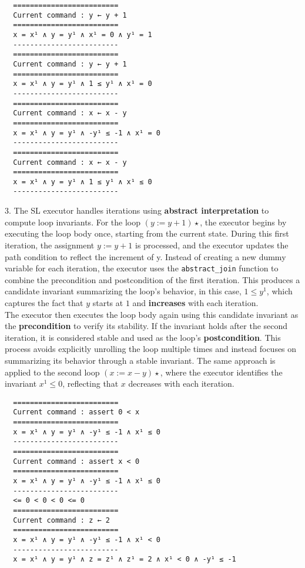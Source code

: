 \documentclass[parskip=half]{scrartcl}
\begin{document}
\begin{verbatim}
  =========================
  Current command : y ← y + 1
  =========================
  x = x¹ ∧ y = y¹ ∧ x¹ = 0 ∧ y¹ = 1
  -------------------------
  =========================
  Current command : y ← y + 1
  =========================
  x = x¹ ∧ y = y¹ ∧ 1 ≤ y¹ ∧ x¹ = 0
  -------------------------
  =========================
  Current command : x ← x - y
  =========================
  x = x¹ ∧ y = y¹ ∧ -y¹ ≤ -1 ∧ x¹ = 0
  -------------------------
  =========================
  Current command : x ← x - y
  =========================
  x = x¹ ∧ y = y¹ ∧ 1 ≤ y¹ ∧ x¹ ≤ 0
  -------------------------
\end{verbatim}
3. The SL executor handles iterations using \textbf{abstract interpretation} to compute loop invariants. For the loop $(y := y + 1)⋆$, the executor begins by executing the loop body once, starting from the current state. During this first iteration, the assignment $y := y + 1$ is processed, and the executor updates the path condition to reflect the increment of y. Instead of creating a new dummy variable for each iteration, the executor uses the \texttt{abstract\_join} function to combine the precondition and postcondition of the first iteration. This produces a candidate invariant summarizing the loop's behavior, in this case, $1 \leq y^1$, which captures the fact that $y$ starts at $1$ and \textbf{increases} with each iteration. 
\\The executor then executes the loop body again using this candidate invariant as the \textbf{precondition} to verify its stability. If the invariant holds after the second iteration, it is considered stable and used as the loop's \textbf{postcondition}. This process avoids explicitly unrolling the loop multiple times and instead focuses on summarizing its behavior through a stable invariant. The same approach is applied to the second loop $(x := x - y)⋆$, where the executor identifies the invariant $x^1 \leq 0$, reflecting that $x$ decreases with each iteration.
\begin{verbatim}
  =========================
  Current command : assert 0 < x
  =========================
  x = x¹ ∧ y = y¹ ∧ -y¹ ≤ -1 ∧ x¹ ≤ 0
  -------------------------
  =========================
  Current command : assert x < 0
  =========================
  x = x¹ ∧ y = y¹ ∧ -y¹ ≤ -1 ∧ x¹ ≤ 0
  -------------------------
  <= 0 < 0 < 0 <= 0
  =========================
  Current command : z ← 2
  =========================
  x = x¹ ∧ y = y¹ ∧ -y¹ ≤ -1 ∧ x¹ < 0
  -------------------------
  x = x¹ ∧ y = y¹ ∧ z = z¹ ∧ z¹ = 2 ∧ x¹ < 0 ∧ -y¹ ≤ -1
\end{verbatim}
\end{document}
